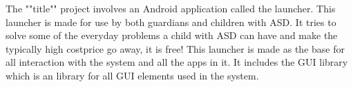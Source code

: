 The ""title"" project involves an Android\texttrademark  \hspace{1pt} application called the launcher. This launcher is made for use by both guardians and children with ASD. It tries to solve some of the everyday problems a child with ASD can have and make the typically high costprice go away, it is free! This launcher is made as the base for all interaction with the \giraf[] system and all the apps in it. It includes the \giraf[] GUI library which is an library for all GUI elements used in the \giraf[] system.